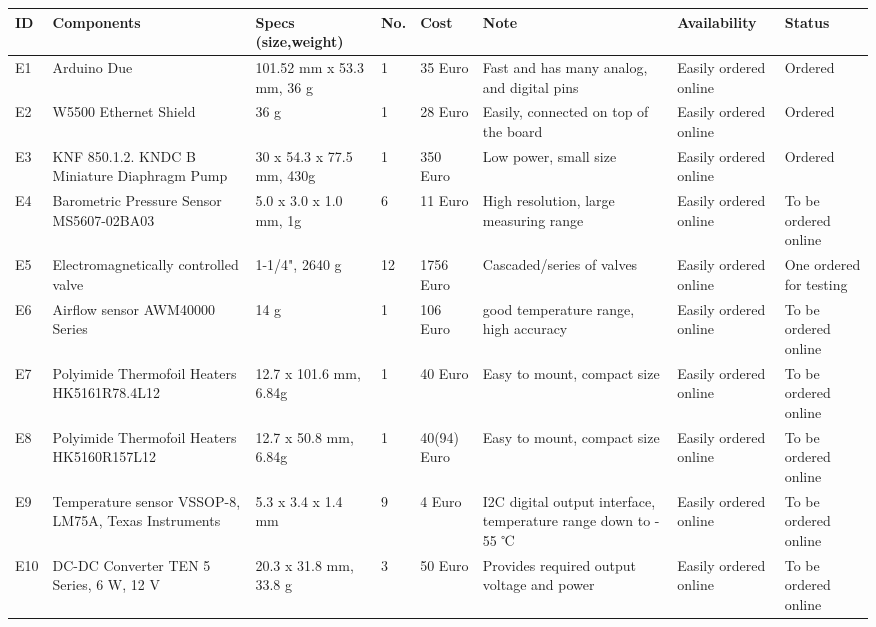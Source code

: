 


\begin{longtable}{|m{}|m{}|m{}|m{}|m{}|m{}|m{}|m{}|}
    
\hline
\textbf{ID} & \textbf{Components} & \textbf{Specs (size,weight)} & \textbf{No.} & \textbf{Cost} & \textbf{Note} & \textbf{Availability} & \textbf{Status} \\ 
\hline
E1 & Arduino Due & 101.52 mm x 53.3 mm, 36 g & 1 & 35 Euro & Fast and has many analog, and digital pins & Easily ordered online & Ordered \\ \hline
E2 & W5500 Ethernet Shield  & 36 g & 1 & 28 Euro & Easily, connected on top of the board & Easily ordered online & Ordered \\ \hline
E3 & KNF 850.1.2. KNDC B Miniature Diaphragm Pump & 30 x 54.3 x 77.5 mm, 430g  & 1 & 350 Euro & Low power, small size & Easily ordered online & Ordered \\ \hline
E4 & Barometric Pressure Sensor MS5607-02BA03 & 5.0 x 3.0 x 1.0 mm, 1g  & 6 &  11 Euro & High resolution, large measuring range & Easily ordered online & To be ordered online \\ \hline
E5 & Electromagnetically controlled valve & 1-1/4", 2640 g & 12 & 1756 Euro & Cascaded/series of valves & Easily ordered online & One ordered for testing \\ \hline
E6 & Airflow sensor AWM40000 Series & 14 g & 1 & 106 Euro & good temperature range, high accuracy & Easily ordered online & To be ordered online \\ \hline
E7 & Polyimide Thermofoil Heaters HK5161R78.4L12 & 12.7 x 101.6 mm, 6.84g & 1 & 40 Euro & Easy to mount, compact size & Easily ordered online & To be ordered online \\ \hline
E8 & Polyimide Thermofoil Heaters HK5160R157L12 & 12.7 x 50.8 mm, 6.84g & 1 & 40(94) Euro & Easy to mount, compact size & Easily ordered online & To be ordered online \\ \hline
E9 & Temperature sensor VSSOP-8, LM75A, Texas Instruments & 5.3 x 3.4 x 1.4 mm & 9 & 4 Euro & I2C digital output interface, temperature range down to - 55 ℃ & Easily ordered online & To be ordered online \\ \hline
E10 & DC-DC Converter TEN 5 Series, 6 W, 12 V & 20.3 x 31.8 mm, 33.8 g & 3 & 50 Euro & Provides required output voltage and power & Easily ordered online & To be ordered online \\ \hline

\end{longtable}
